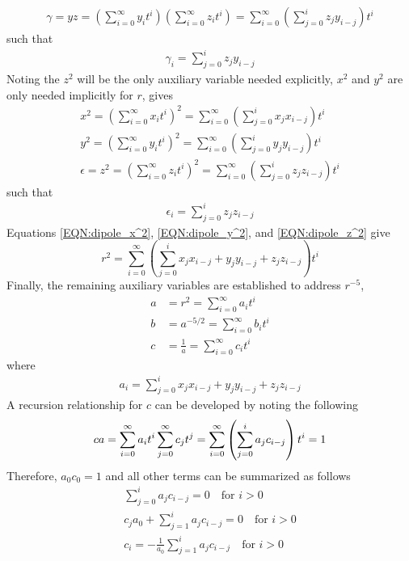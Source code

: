 \documentclass{article}
\begin{document}
    \begin{align}
            \gamma=yz=\left(\sum_{i=0}^\infty y_it^i\right)\left(\sum_{i=0}^\infty z_it^i\right)=\sum_{i=0}^\infty\left(\sum_{j=0}^i z_jy_{i-j} \right)t^i
    \end{align}
such that
    \begin{align}
        \gamma_i=\sum_{j=0}^i z_jy_{i-j}
    \end{align}
Noting the $z^2$ will be the only auxiliary variable needed explicitly, $x^2$ and $y^2$ are only needed implicitly for $r$, gives
    \begin{align}
        x^2=\left(\sum_{i=0}^\infty x_it^i\right)^2=\sum_{i=0}^\infty\left(\sum_{j=0}^i x_jx_{i-j} \right)t^i\label{EQN:dipole_x^2}\\
        y^2=\left(\sum_{i=0}^\infty y_it^i\right)^2=\sum_{i=0}^\infty\left(\sum_{j=0}^i y_jy_{i-j} \right)t^i\label{EQN:dipole_y^2}\\
        \epsilon=z^2=\left(\sum_{i=0}^\infty z_it^i\right)^2=\sum_{i=0}^\infty\left(\sum_{j=0}^i z_jz_{i-j} \right)t^i\label{EQN:dipole_z^2}
    \end{align}
such that 
    \begin{align}
        \epsilon_i=\sum_{j=0}^i z_jz_{i-j}
    \end{align}
Equations \ref{EQN:dipole_x^2}, \ref{EQN:dipole_y^2}, and \ref{EQN:dipole_z^2} give
    \begin{equation}
        r^2=\sum_{i=0}^\infty \left(\sum_{j=0}^i x_jx_{i-j}+y_jy_{i-j}+z_jz_{i-j}\right)t^i
    \end{equation}
Finally, the remaining auxiliary variables are established to address $r^{-5}$,
\begin{align}
    a &= r^2 = \sum_{i=0}^\infty a_i t^i \\
    b &= a^{-5/2} = \sum_{i=0}^\infty b_i t^i \\
    c &= \frac{1}{a} = \sum_{i=0}^\infty c_i t^i
\end{align}
where 
    \begin{align}
        a_i=\sum_{j=0}^i x_jx_{i-j}+y_jy_{i-j}+z_jz_{i-j}\label{eqn:afordipole}
    \end{align}
A recursion relationship for $c$ can be developed by noting the following
\begin{equation}
ca=\sum_{i=0}^\infty a_it^i\sum_{j=0}^\infty c_jt^j=\sum_{i=0}^\infty\left(\sum_{j=0}^i a_jc_{i-j} \right)t^i=1\\
\end{equation}
Therefore, $a_0c_0=1$ and all other terms can be summarized as follows 
\begin{align}
\sum_{j=0}^i a_jc_{i-j} =0\quad\text{for } i>0\\
c_ja_0+ \sum_{j=1}^i a_jc_{i-j} =0\quad\text{for }i>0\\
c_i=-\frac{1}{a_0} \sum_{j=1}^i a_jc_{i-j}\quad\text{for } i>0 \label{eqn:cfordipole}
\end{align}
\end{document}
